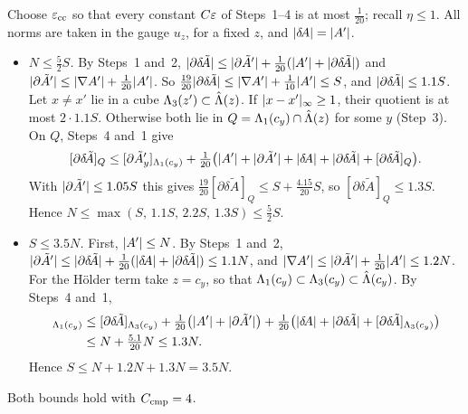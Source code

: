 \begin{detail}
\begin{step}[Conclusion]
Choose $\varepsilon_{\rm cc}$ so that every constant $C\varepsilon$ of Steps~1--4 is at most $\frac1{20}$; recall $\eta\le1$. All norms are taken in the gauge $u_z$, for a fixed $z$, and $\lvert\delta\!A\rvert=\lvert A'\rvert$.
\begin{itemize}
\item \emph{$N\le\frac52S$.} By Steps~1 and~2, $\lvert\partial\delta\!\tilde A\rvert\le\lvert\partial\tilde A'\rvert+\frac1{20}(\lvert A'\rvert+\lvert\partial\delta\!\tilde A\rvert)$ and $\lvert\partial\tilde A'\rvert\le\lvert\nabla A'\rvert+\frac1{20}\lvert A'\rvert$. So $\frac{19}{20}\lvert\partial\delta\!\tilde A\rvert\le\lvert\nabla A'\rvert+\frac1{10}\lvert A'\rvert\le S$, and $\lvert\partial\delta\!\tilde A\rvert\le1.1S$. Let $x\ne x'$ lie in a cube $\Lambda_3(z')\subset\hat{\Lambda}(z)$. If $\lvert x-x'\rvert_\infty\ge1$, their quotient is at most $2\cdot1.1S$. Otherwise both lie in $Q=\Lambda_1(c_y)\cap\hat{\Lambda}(z)$ for some $y$ (Step~3). On $Q$, Steps~4 and~1 give
  \[
  [\partial\delta\!\tilde A]_Q\le[\partial\tilde A'_y]_{\Lambda_1(c_y)}+\tfrac1{20}\big(\lvert A'\rvert+\lvert\partial\tilde A'\rvert+\lvert\delta\!A\rvert+\lvert\partial\delta\!\tilde A\rvert+[\partial\delta\!\tilde A]_Q\big).
  \]
  With $\lvert\partial\tilde A'\rvert\le1.05S$ this gives $\frac{19}{20}[\partial\delta\!\tilde A]_Q\le S+\frac{4.15}{20}S$, so $[\partial\delta\!\tilde A]_Q\le1.3S$. Hence $N\le\max(S,\,1.1S,\,2.2S,\,1.3S)\le\frac52S$.
\item \emph{$S\le3.5N$.} First, $\lvert A'\rvert\le N$. By Steps~1 and~2, $\lvert\partial\tilde A'\rvert\le\lvert\partial\delta\!\tilde A\rvert+\frac1{20}(\lvert\delta\!A\rvert+\lvert\partial\delta\!\tilde A\rvert)\le1.1N$, and $\lvert\nabla A'\rvert\le\lvert\partial\tilde A'\rvert+\frac1{20}\lvert A'\rvert\le1.2N$. For the H\"older term take $z=c_y$, so that $\Lambda_1(c_y)\subset\Lambda_3(c_y)\subset\hat{\Lambda}(c_y)$. By Steps~4 and~1,
  \begin{align*}
  [\partial\tilde A'_y]_{\Lam_1(c_y)}&\le[\partial\delta\!\tilde A]_{\Lam_3(c_y)}+\tfrac1{20}\big(\xaabs{A'}+\xaabs{\partial\tilde A'}\big)+\tfrac1{20}\big(\xaabs{\delta\!A}+\xaabs{\partial\delta\!\tilde A}+[\partial\delta\!\tilde A]_{\Lam_3(c_y)}\big)\\
  &\le N+\tfrac{5.1}{20}N\le1.3N .
  \end{align*}
  Hence $S\le N+1.2N+1.3N=3.5N$.
\end{itemize}
Both bounds hold with $C_{\rm cmp}=4$.
\end{step}


\end{detail}
